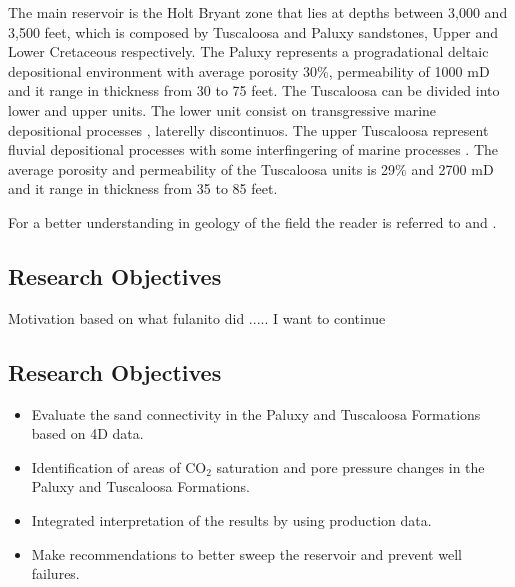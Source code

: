 The main reservoir is the Holt Bryant zone that lies at depths between 3,000 and 3,500
feet,  which is composed by Tuscaloosa and Paluxy sandstones, Upper and Lower Cretaceous 
respectively. The Paluxy represents a progradational deltaic depositional environment
 \cite{ref:nick} with average porosity 30\%, permeability of 1000 mD and it range in thickness
from 30 to 75 feet. The Tuscaloosa can be divided into lower and upper units. The lower unit 
consist on transgressive marine depositional processes \cite{ref:doug}, laterelly discontinuos.
The upper Tuscaloosa represent fluvial depositional processes with some interfingering of marine
processes \cite{ref:doug}. The average porosity and permeability of the Tuscaloosa units is 29\%
 and 2700 mD and it range in thickness from 35 to 85 feet.     



For a better understanding in geology of the field the reader is referred 
to \cite{ref:nick} and \cite{ref:doug}.







\subsection{Research Objectives}
Motivation based on what fulanito did ..... I want to continue 

\subsection{Research Objectives}

\begin{itemize}
\item Evaluate the sand connectivity in the Paluxy and Tuscaloosa Formations based on 4D data.  
\item Identification of areas of CO$_2$ saturation and pore pressure changes in the Paluxy and Tuscaloosa Formations. 
\item Integrated interpretation of the results by using production data. 
\item Make recommendations to better sweep the reservoir and prevent well failures.
\end{itemize}



\clearpage


   
   
